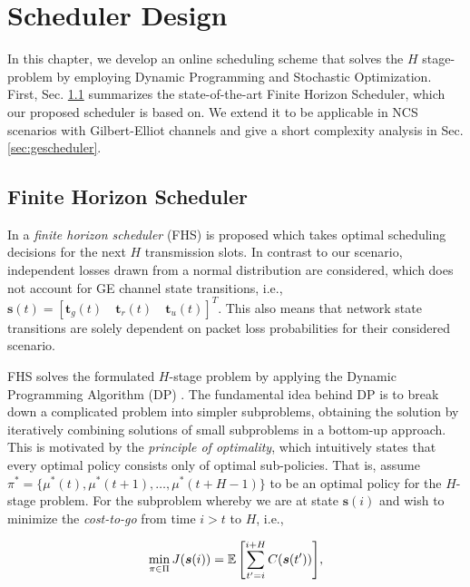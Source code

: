 \chapter{Scheduler Design} \label{ch:scheduler}

In this chapter, we develop an online scheduling scheme that solves the $H$
stage-problem by employing Dynamic Programming and Stochastic Optimization.
First, Sec. \ref{sec:fhscheduler} summarizes the state-of-the-art Finite Horizon
Scheduler, which our proposed scheduler is based on. We extend it to be
applicable in NCS scenarios with Gilbert-Elliot channels and give a short
complexity analysis in Sec. \ref{sec:gescheduler}.

\section{Finite Horizon Scheduler} \label{sec:fhscheduler}

In \cite{ayan2020aoi} a \textit{finite horizon scheduler} (FHS) is proposed
which takes optimal scheduling decisions for the next $H$ transmission slots. In
contrast to our scenario, independent losses drawn from a normal distribution
are considered, which does not account for GE channel state transitions, i.e.,
$\boldsymbol{s}(t) = \left[\boldsymbol{t}_g(t) \quad \boldsymbol{t}_r(t) \quad
\boldsymbol{t}_u(t) \right]^T$. This also means that network state transitions
are solely dependent on packet loss probabilities for their considered scenario.

FHS solves the formulated $H$-stage problem by applying the Dynamic Programming
Algorithm (DP) \cite{bertsekas1995dynamic}. The fundamental idea behind DP is to
break down a complicated problem into simpler subproblems, obtaining the
solution by iteratively combining solutions of small subproblems in a bottom-up
approach. This is motivated by the \textit{principle of optimality}, which
intuitively states that every optimal policy consists only of optimal
sub-policies. That is, assume $\pi^* = \{\mu^*(t), \mu^*(t+1), \dots,
\mu^*(t+H-1) \}$ to be an optimal policy for the $H$-stage problem. For the
subproblem whereby we are at state $\boldsymbol{s}(i)$ and wish to minimize the
\textit{cost-to-go} from time $i>t$ to $H$, i.e.,

\begin{equation}
  \label{eq:costtogo}
  \min_{\pi\in\Pi}{J(\boldsymbol{s}(i)) = \mathbb{E} \left[ \sum_{t' = i }^{i+H} C(\boldsymbol{s}(t')) \right]},
\end{equation}

